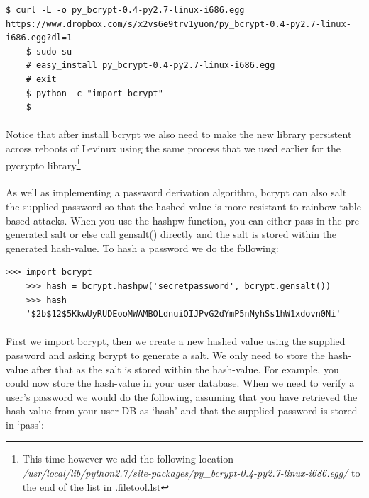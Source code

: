 \documentclass[12pt, a4paper, twoside]{book}
\begin{document}
\begin{lstlisting}[style=DOS]
    $ curl -L -o py_bcrypt-0.4-py2.7-linux-i686.egg https://www.dropbox.com/s/x2vs6e9trv1yuon/py_bcrypt-0.4-py2.7-linux-i686.egg?dl=1
    $ sudo su
    # easy_install py_bcrypt-0.4-py2.7-linux-i686.egg
    # exit
    $ python -c "import bcrypt"
    $
\end{lstlisting}

\paragraph{} Notice that after install bcrypt we also need to make the new library persistent across reboots of Levinux using the same process that we used earlier for the pycrypto library\footnote{This time however we add the following location \emph{/usr/local/lib/python2.7/site-packages/py\_bcrypt-0.4-py2.7-linux-i686.egg/} to the end of the list in .filetool.lst}

\paragraph{} As well as implementing a password derivation algorithm, bcrypt can also salt the supplied password so that the hashed-value is more resistant to rainbow-table based attacks. When you use the hashpw function, you can either pass in the pre-generated salt or else call gensalt() directly and the salt is stored within the generated hash-value. To hash a password we do the following:

\begin{lstlisting}[style=DOS]
    >>> import bcrypt
    >>> hash = bcrypt.hashpw('secretpassword', bcrypt.gensalt())
    >>> hash
    '$2b$12$5KkwUyRUDEooMWAMBOLdnuiOIJPvG2dYmP5nNyhSs1hW1xdovn0Ni'
\end{lstlisting}

\paragraph{} First we import bcrypt, then we create a new hashed value using the supplied password and asking bcrypt to generate a salt. We only need to store the hash-value after that as the salt is stored within the hash-value. For example, you could now store the hash-value in your user database. When we need to verify a user's password we would do the following, assuming that you have retrieved the hash-value from your user DB as `hash' and that the supplied password is stored in `pass':
\end{document}
